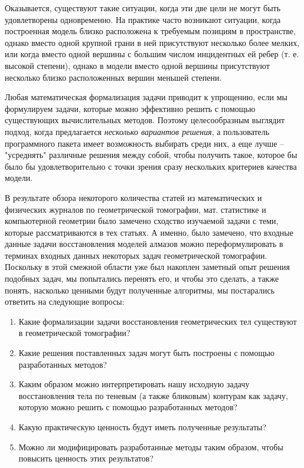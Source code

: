 \documentclass[a4paper, 12pt, titlepage]{article}
\theoremstyle{definition}
\theoremstyle{plain}
\theoremstyle{plain}
\begin{document}
Оказывается, существуют такие ситуации, когда эти две цели не могут быть
удовлетворены одновременно. На практике часто возникают ситуации, когда
построенная модель близко расположена к требуемым позициям в пространстве,
однако вместо одной крупной грани в ней присутствуют несколько более
мелких, или когда вместо одной вершины с большим числом инцидентных ей
ребер (т. е. высокой степени), однако в модели вместо одной вершины присутствуют
несколько близко расположенных вершин меньшей степени.

Любая математическая формализация задачи приводит к упрощению, если мы
формулируем задачи, которые можно эффективно решить с помощью существующих
вычислительных методов. Поэтому целесообразным выглядит подход, когда
предлагается \textit{несколько вариантов решения}, а пользователь программного
пакета имеет возможность выбирать среди них, а еще лучше -- "усреднять"
различные решения между собой, чтобы получить такое, которое бы
было бы удовлетворительно с точки зрения сразу нескольких критериев качества
модели.

В результате обзора некоторого количества статей из математических и
физических журналов по геометрической томографии, мат. статистике и компьютерной
геометрии было замечено сходство изучаемой задачи с теми, которые
рассматриваются в тех статьях. А именно, было замечено, что входные данные
задачи восстановления моделей алмазов можно переформулировать в терминах входных
данных некоторых задач геометрической томографии. Поскольку в этой смежной
области уже был накоплен заметный опыт решения подобных задач, мы попытались
перенять его, и чтобы это сделать, а также понять, насколько ценными будут
полученные алгоритмы, мы постарались ответить на следующие вопросы:

\begin{enumerate}
 \item Какие формализации задачи восстановления геометрических тел существуют в
геометрической томографии?
 \item Какие решения поставленных задач могут быть построены с помощью
разработанных методов?
 \item Каким образом можно интерпретировать нашу исходную задачу восстановления
тела по теневым (а также бликовым) контурам как задачу, которую можно решить с
помощью разработанных методов?
 \item Какую практическую ценность будут иметь полученные результаты?
 \item Можно ли модифицировать разработанные методы таким образом, чтобы
повысить ценность этих результатов?
\end{enumerate}
\end{document}
